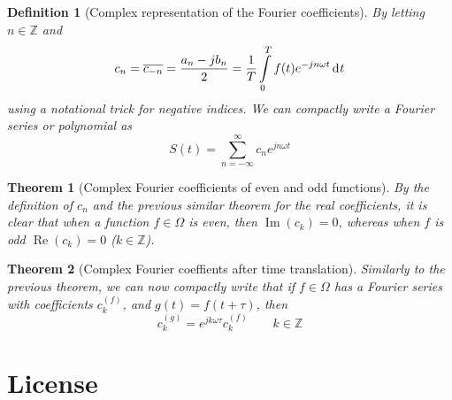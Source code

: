\documentclass[twocolumn, margin=small]{tex/hsrzf}
\newcommand\Zset{\mathbb{Z}}
\newcommand\conj[1]{\overline{#1}}
\renewcommand\Re{\operatorname{Re}}
\renewcommand\Im{\operatorname{Im}}
\theoremstyle{komfourzf}
\newtheorem{theorem}{Theorem}
\newtheorem{definition}{Definition}
\begin{document}
\begin{definition}[Complex representation of the Fourier coefficients]
  By letting \(n\in\Zset\) and
  \[
    c_n = \conj{c_{-n}} = \frac{a_n - jb_n}{2} = \frac{1}{T}\int\limits_0^T f(t) e^{-jn\omega t} \di{t}
  \]
  using a notational trick for negative indices. We can compactly write a Fourier series or polynomial as
  \[
    S(t) = \sum_{n=-\infty}^\infty c_n e^{jn\omega t}
  \]
\end{definition}

\begin{theorem}[Complex Fourier coefficients of even and odd functions]
  By the definition of \(c_n\) and the previous similar theorem for the real coefficients, it is clear that when a function \(f\in\Omega\) is \emph{even}, then \(\Im(c_k) = 0\), whereas when \(f\) is \emph{odd} \(\Re(c_k) = 0\) (\(k\in\Zset\)).
\end{theorem}

\begin{theorem}[Complex Fourier coeffients after time translation]
  Similarly to the previous theorem, we can now compactly write that if \(f\in\Omega\) has a Fourier series with coefficients \(c_k^{(f)}\), and \(g(t) = f(t + \tau)\), then
  \[
    c_k^{(g)} = e^{jk\omega \tau} c_k^{(f)} \qquad k \in \Zset
  \]
\end{theorem}


\section{License}
\doclicenseThis
\end{document}
